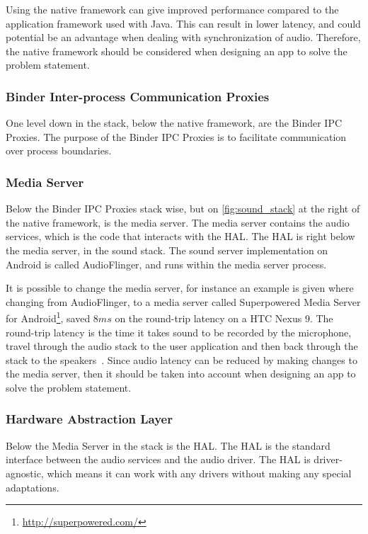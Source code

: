 Using the native framework can give improved performance compared to the application framework used with Java\cite{nat_perf_2}.
This can result in lower latency, and could potential be an advantage when dealing with synchronization of audio.
Therefore, the native framework should be considered when designing an app to solve the problem statement.

\subsubsection*{Binder Inter-process Communication Proxies}
One level down in the stack, below the native framework, are the Binder \ac{IPC} Proxies.
The purpose of the Binder \ac{IPC} Proxies is to facilitate communication over process boundaries.

\subsubsection*{Media Server}
Below the Binder \ac{IPC} Proxies stack wise, but on \cref{fig:sound_stack} at the right of the native framework, is the media server.
The media server contains the audio services, which is the code that interacts with the \ac{HAL}.
The \ac{HAL} is right below the media server, in the sound stack.
The sound server implementation on Android is called AudioFlinger, and runs within the media server process\cite{audioflinger}.

It is possible to change the media server,
for instance an example is given where changing from AudioFlinger, to a media server called Superpowered Media Server for Android\footnote{\url{http://superpowered.com/}}, saved $8 ms$ on the round-trip latency on a HTC Nexus 9\cite{superpowered_8ms}.
The round-trip latency is the time it takes sound to be recorded by the microphone,
travel through the audio stack to the user application and then back through the stack to the speakers~\cite{superpowered_8ms}.
Since audio latency can be reduced by making changes to the media server,
then it should be taken into account when designing an app to solve the problem statement.

\subsubsection*{Hardware Abstraction Layer}
Below the Media Server in the stack is the \ac{HAL}.
The \ac{HAL} is the standard interface between the audio services and the audio driver.
The \ac{HAL} is driver-agnostic, which means it can work with any drivers without making any special adaptations.

